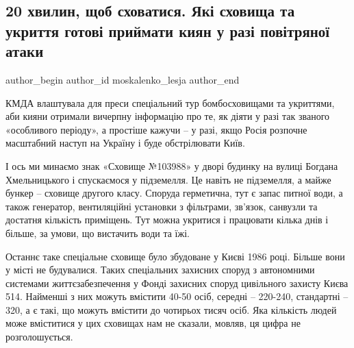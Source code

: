  
 
 
 
 
\subsection{20 хвилин, щоб сховатися. Які сховища та укриття готові приймати киян у разі повітряної атаки}
\label{sec:09_12_2021.stz.kiev.bigkyiv.1.bomboubezhische}

\ifcmt
 author_begin
   author_id moskalenko_lesja
 author_end
\fi



КМДА влаштувала для преси  спеціальний тур бомбосховищами та укриттями, аби
кияни отримали вичерпну інформацію про те, як діяти у разі так званого
«особливого періоду», а простіше кажучи – у разі, якщо Росія розпочне
масштабний наступ на Україну і буде обстрілювати Київ. 

І ось ми минаємо знак «Сховище №103988» у дворі будинку на вулиці Богдана
Хмельницького і спускаємося у підземелля.  Це навіть не підземелля, а майже
бункер – сховище другого класу. Споруда герметична, тут є запас питної води, а
також генератор, вентиляційні установки з фільтрами, зв’язок, санвузли та
достатня кількість приміщень. Тут можна укритися і працювати кілька днів і
більше, за умови, що вистачить води та їжі.

Останнє таке спеціальне сховище було збудоване у Києві 1986 році. Більше вони у
місті  не будувалися. Таких спеціальних захисних споруд з автономними системами
життєзабезпечення у Фонді захисних споруд цивільного захисту Києва 514.
Найменші з них можуть вмістити 40-50 осіб, середні – 220-240, стандартні – 320,
а є такі, що можуть вмістити до чотирьох тисяч осіб. Яка кількість людей може
вміститися у цих сховищах нам не сказали, мовляв, ця цифра не розголошується.

